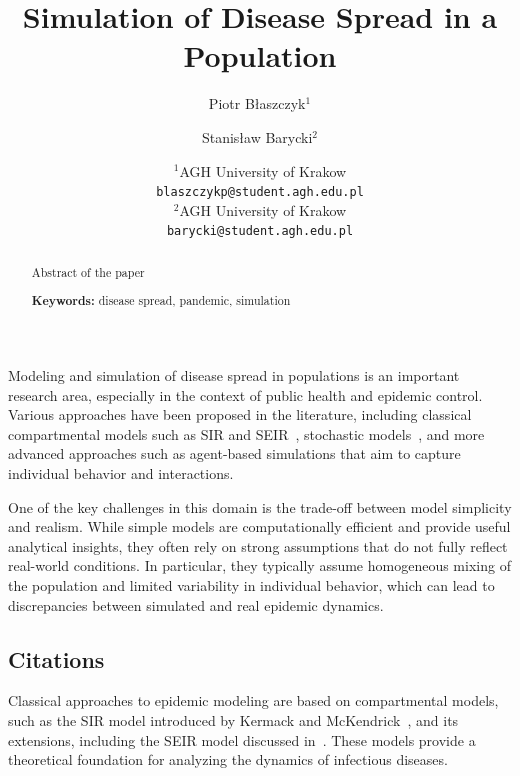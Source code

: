 \documentclass[english]{projectreport}
\author{Piotr Błaszczyk$^1$ \and Stanisław Barycki$^2$}
\title{Simulation of Disease Spread in a Population}
\date{
	{\small
	$^1$AGH University of Krakow \\ \texttt{blaszczykp@student.agh.edu.pl}\\[1ex]%
	$^2$AGH University of Krakow \\ \texttt{barycki@student.agh.edu.pl}\\[2ex]%
	\the\year}
}
\begin{document}
\maketitle

\thispagestyle{empty}

\begin{abstract}
\noindent Abstract of the paper

\noindent\textbf{Keywords:} disease spread, pandemic, simulation
\end{abstract}


\section{\SectionTitleIntroduction}
\label{sec:introduction}

Modeling and simulation of disease spread in populations is an important research area, especially in the context of public health and epidemic control. Various approaches have been proposed in the literature, including classical compartmental models such as SIR and SEIR~\cite{kermack1927sir, hethcote2000mathematics}, stochastic models~\cite{allen2017primer}, and more advanced approaches such as agent-based simulations that aim to capture individual behavior and interactions.

One of the key challenges in this domain is the trade-off between model simplicity and realism. While simple models are computationally efficient and provide useful analytical insights, they often rely on strong assumptions that do not fully reflect real-world conditions. In particular, they typically assume homogeneous mixing of the population and limited variability in individual behavior, which can lead to discrepancies between simulated and real epidemic dynamics.

\subsection{Citations}
\label{sec:citations}

Classical approaches to epidemic modeling are based on compartmental models, such as the SIR model introduced by Kermack and McKendrick~\cite{kermack1927sir}, and its extensions, including the SEIR model discussed in~\cite{hethcote2000mathematics}. These models provide a theoretical foundation for analyzing the dynamics of infectious diseases.
\end{document}
